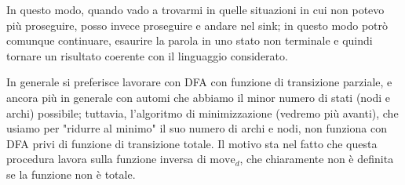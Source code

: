 \documentclass[class=book, crop=false, oneside, 12pt]{standalone}
\begin{document}
In questo modo, quando vado a trovarmi in quelle situazioni in cui non potevo più proseguire, posso invece proseguire e andare nel sink; in questo modo potrò comunque continuare, esaurire la parola in uno stato non terminale e quindi tornare un risultato coerente con il linguaggio considerato.

In generale si preferisce lavorare con DFA con funzione di transizione parziale, e ancora più in generale con automi che abbiamo il minor numero di stati (nodi e archi) possibile; tuttavia, l'algoritmo di minimizzazione (vedremo più avanti), che usiamo per "ridurre al minimo" il suo numero di archi e nodi, non funziona con DFA privi di funzione di transizione totale. Il motivo sta nel fatto che questa procedura lavora sulla funzione inversa di \(\textrm{move}_d\), che chiaramente non è definita se la funzione non è totale.
\end{document}
